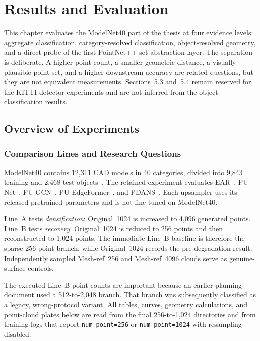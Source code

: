 \chapter{Results and Evaluation}
\label{chap:results}

This chapter evaluates the ModelNet40 part of the thesis at four evidence levels: aggregate classification, category-resolved classification, object-resolved geometry, and a direct probe of the first PointNet++ set-abstraction layer. The separation is deliberate. A higher point count, a smaller geometric distance, a visually plausible point set, and a higher downstream accuracy are related questions, but they are not equivalent measurements. Sections~5.3 and~5.4 remain reserved for the KITTI detector experiments and are not inferred from the object-classification results.

\section{Overview of Experiments}
\label{sec:results-overview}

\subsection{Comparison Lines and Research Questions}

ModelNet40 contains 12,311 CAD models in 40 categories, divided into 9,843 training and 2,468 test objects~\cite{r9}. The retained experiment evaluates EAR~\cite{r3}, PU-Net~\cite{r4}, PU-GCN~\cite{r5}, PU-EdgeFormer~\cite{r6}, and PDANS~\cite{r7}. Each upsampler uses its released pretrained parameters and is not fine-tuned on ModelNet40.

Line~A tests \emph{densification}: Original~1024 is increased to 4,096 generated points. Line~B tests \emph{recovery}: Original~1024 is reduced to 256 points and then reconstructed to 1,024 points. The immediate Line~B baseline is therefore the sparse 256-point branch, while Original~1024 records the pre-degradation result. Independently sampled Mesh-ref~256 and Mesh-ref~4096 clouds serve as genuine-surface controls.

The executed Line~B point counts are important because an earlier planning document used a 512-to-2,048 branch. That branch was subsequently classified as a legacy, wrong-protocol variant. All tables, curves, geometry calculations, and point-cloud plates below are read from the final 256-to-1,024 directories and from training logs that report \texttt{num\_point=256} or \texttt{num\_point=1024} with resampling disabled.

